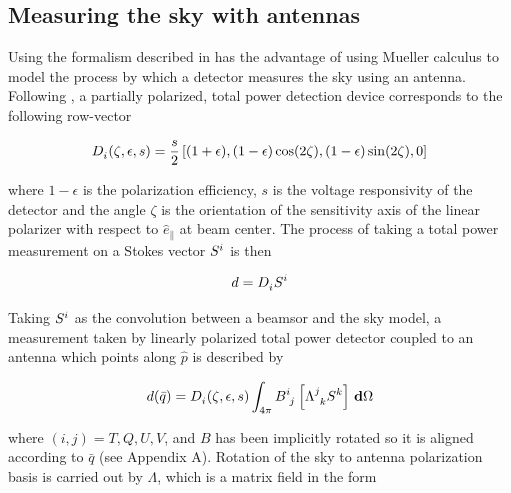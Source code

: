 \documentclass[a4paper,fleqn]{cas-dc}\sloppy
\newcommand{\co}{\mathbin{\|}}
\begin{document}
	\subsection{Measuring the sky with antennas}
	
	Using the formalism described in \cite{2007MNRAS.376.1767O} has the advantage of using Mueller calculus to model the process by which a detector measures the sky using an antenna. Following \cite{2007A&A...470..771J}, a partially polarized, total power detection device corresponds to the following row-vector 
	
	\begin{equation}
	\begin{aligned}
	\tensor{D}{_{i}}(\zeta,\epsilon,s) = \frac{s}{2} \left[(1 + \epsilon), (1 - \epsilon)\cos(2\zeta), (1 - \epsilon)\sin(2\zeta), 0 \right]
	\end{aligned}
	\label{eq::M_pol}
	\end{equation}
	
	\noindent
	where $1 - \epsilon$ is the polarization efficiency, $s$ is the voltage responsivity of the detector and the angle $\zeta$ is the orientation of the sensitivity axis of the linear polarizer with respect to $\hat{e}_{\co}$ at beam center. The process of taking a total power measurement on a Stokes vector $\tensor{S}{^{i}}$ is then
	
	\begin{equation}
	\begin{aligned}
	d = \tensor{D}{_{i}} \tensor{S}{^{i}}
	\end{aligned}
	\label{eq::total_power_measurement}
	\end{equation}
	
	\noindent
	Taking $\tensor{S}{^{i}}$ as the convolution between a beamsor and the sky model, a measurement taken by linearly polarized total power detector coupled to an antenna which points along $\hat{p}$ is described by
	
	\begin{equation}
	\begin{aligned}
	d(\bar{q}) = \tensor{D}{_{i}}(\zeta,\epsilon,s) \int_{4\pi} \tensor{B}{^{i}_{j} } \left[ \tensor{\Lambda}{^{j}_{k} } \tensor{S}{^{k}} \right ] \, \mathbf{d} \Omega
	\end{aligned}
	\label{eq::total_power}
	\end{equation}
	
	\noindent
	where $(i,j) = T,Q,U,V$, and $B$ has been implicitly rotated so it is aligned according to $\bar{q}$ (see Appendix A). Rotation of the sky to antenna polarization basis is carried out by $\Lambda$, which is a matrix field in the form
	
\end{document}
